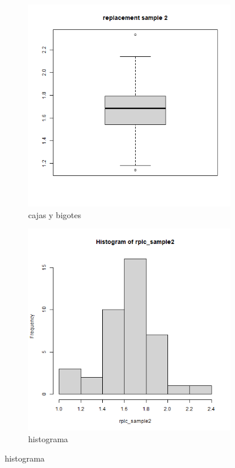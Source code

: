 \documentclass[a4paper,12pt]{article}
\begin{document}
\begin{enumerate}
\begin{figure}[t!]
    \centering
    \begin{subfigure}[b]{0.4\linewidth}             
        \includegraphics[width = \linewidth]{./datos generados (Ejercicio 1)/replacement_sample2_boxplot.png}
        \caption{cajas y bigotes}
    \end{subfigure}
    \begin{subfigure}[b]{0.4\linewidth}               
        \includegraphics[width = \linewidth]{./datos generados (Ejercicio 1)/replacement_sample2_hist.png}
        \caption{histograma}
    \end{subfigure}


\end{figure}
\end{enumerate}
\end{document}
